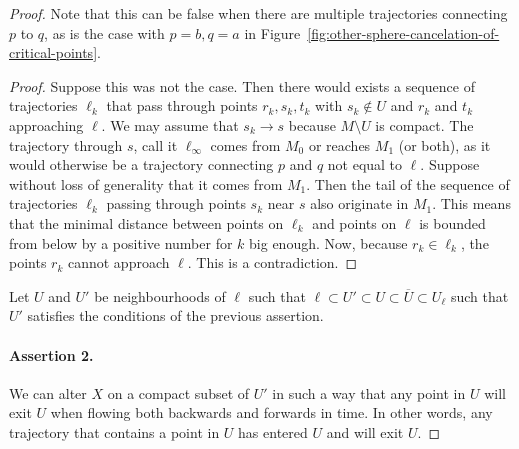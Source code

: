 \begin{proof}
Note that this can be false when there are multiple trajectories connecting $p$ to $q$, as is the case with $p = b, q = a$ in Figure~\ref{fig:other-sphere-cancelation-of-critical-points}.
\begin{proof}
    Suppose this was not the case.
    Then there would exists a sequence of trajectories $\ell_k$ that pass through points $r_k, s_k, t_k$ with $s_k \not\in U$ and $r_k$ and $t_k$ approaching $\ell$.
    We may assume that $s_k \to s$ because $M \setminus U$ is compact.
    The trajectory through $s$, call it $ \ell_\infty$ comes from  $ M_0$ or reaches $ M_1$ (or both), as it would otherwise be a trajectory connecting $p$ and $q$ not equal to $\ell$.
    Suppose without loss of generality that it comes from $M_1$.
    Then the tail of the sequence of trajectories $\ell_{k}$ passing through points $s_k$ near $s$ also originate in $M_1$.
    This means that the minimal distance between points on $\ell_{k}$ and points on $\ell$ is bounded from below by a positive number for $k$ big enough.
    Now, because $r_k \in \ell_k$, the points $r_k$ cannot approach  $\ell$. This is a contradiction.
\end{proof}

Let $U$ and $U'$ be neighbourhoods of $\ell$ such that $\ell \subset U' \subset U \subset \overline{U} \subset U_\ell$ such that $U'$ satisfies the conditions of the previous assertion.

\paragraph{Assertion 2.}
We can alter $X$ on a compact subset of $U'$ in such a way that any point in $U$ will exit $U$ when flowing both backwards and forwards in time.
In other words, any trajectory that contains a point in $U$ has entered $U$  and will exit $U$.


\end{proof}
